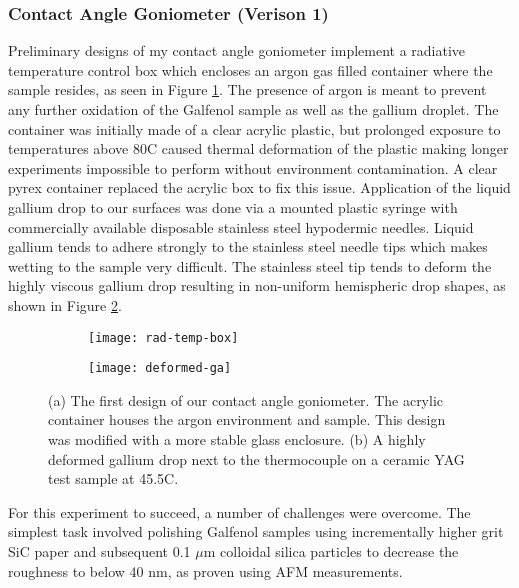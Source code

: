 
\subsubsection{Contact Angle Goniometer (Verison 1)}
Preliminary designs of my contact angle goniometer implement a radiative temperature control box which encloses an argon gas filled container where the sample resides, as seen in Figure \ref{fig:rad-temp-box}.  The presence of argon is meant to prevent any further oxidation of the Galfenol sample as well as the gallium droplet. The container was initially made of a clear acrylic plastic, but prolonged exposure to temperatures above 80\degree C caused thermal deformation of the plastic making longer experiments impossible to perform without environment contamination.  A clear pyrex container replaced the acrylic box to fix this issue.  Application of the liquid gallium drop to our surfaces was done via a mounted plastic syringe with commercially available disposable stainless steel hypodermic needles. Liquid gallium tends to adhere strongly to the stainless steel needle tips which makes wetting to the sample very difficult. The stainless steel tip tends to deform the highly viscous gallium drop resulting in non-uniform hemispheric drop shapes, as shown in Figure \ref{fig:deformed-ga}.
\begin{figure}
	\centering
	\begin{subfigure}[c]{0.45\textwidth}
		\texttt{[image: rad-temp-box]}
		\subcaption{~}
		\label{fig:rad-temp-box}		
	\end{subfigure}
	\begin{subfigure}[c]{0.45\textwidth} 
		\texttt{[image: deformed-ga]}
		\subcaption{~}
		\label{fig:deformed-ga}		
	\end{subfigure}
	\caption{(a) The first design of our contact angle goniometer.  The acrylic container houses the argon environment and sample.  This design was modified with a more stable glass enclosure. (b) A highly deformed gallium drop next to the thermocouple on a ceramic YAG test sample at 45.5\degree C.}
	\label{fig:prelim-design}
\end{figure}

For this experiment to succeed, a number of challenges were overcome. The simplest task involved polishing Galfenol samples using incrementally higher grit SiC paper and subsequent 0.1 $\mu$m colloidal silica particles to decrease the roughness to below 40 nm, as proven using AFM measurements. %

